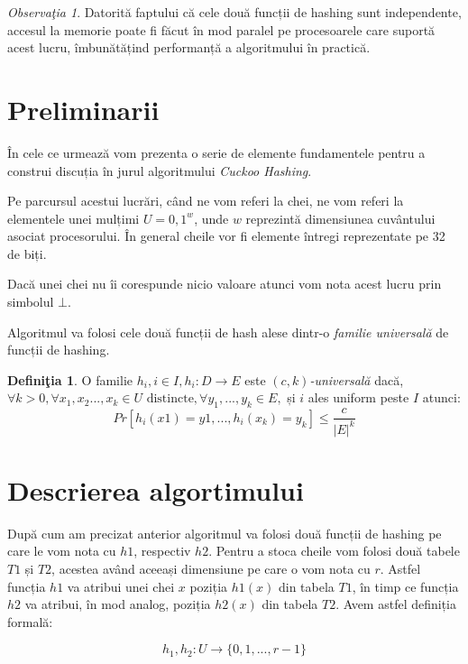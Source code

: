 \documentclass[a4paper]{article}
\theoremstyle{remark}
\newtheorem{remark}{Observa\c{t}ia}
\theoremstyle{definition}
\newtheorem{definition}{Defini\c{t}ia}[section]
\begin{document}
\begin{remark}
Datorită faptului că cele două funcții de hashing sunt independente, accesul la memorie poate fi făcut în mod paralel pe procesoarele care suportă acest lucru, îmbunătățind performanță a algoritmului în practică.
\end{remark}

\section {Preliminarii}

În cele ce urmează vom prezenta o serie de elemente fundamentele pentru a construi discuția în jurul algoritmului \textit{Cuckoo Hashing}.

Pe parcursul acestui lucrări, când ne vom referi la chei, ne vom referi la elementele unei mulțimi $U = {0,1}^w$, unde $w$ reprezintă dimensiunea cuvântului asociat procesorului. În general cheile vor fi elemente întregi reprezentate pe 32 de biți.

Dacă unei chei nu îi corespunde nicio valoare atunci vom nota acest lucru prin simbolul $\bot$.

Algoritmul va folosi cele două funcții de hash alese dintr-o \textit{familie universală} de funcții de hashing.

\begin{definition}
O familie  $h_i, i \in I, h_i:D \to E$  este \textit{$(c,k)$-universală} dacă, $\forall k > 0, \forall x_1, x_2 ..., x_k \in U \text{ distincte}, \forall y_1, ..., y_k \in E,$ și $i$ ales uniform peste $I$ atunci: \\ \[Pr[h_i(x1) = y1, ..., h_i(x_k) = y_k] \leq \frac{c}{|E|^k}\]
\end{definition}

\section {Descrierea algortimului}

După cum am precizat anterior algoritmul va folosi două funcții de hashing pe care le vom nota cu $h1$, respectiv $h2$. Pentru a stoca cheile vom folosi două tabele $T1$ și $T2$, acestea având aceeași dimensiune pe care o vom nota cu $r$. Astfel funcția $h1$ va atribui unei chei $x$ poziția $h1(x)$ din tabela $T1$, în timp ce funcția $h2$ va atribui, în mod analog, poziția $h2(x)$ din tabela $T2$. Avem astfel definiția formală:

\[h_1, h_2: U \to \{0, 1, ..., r-1\}\]
\end{document}
